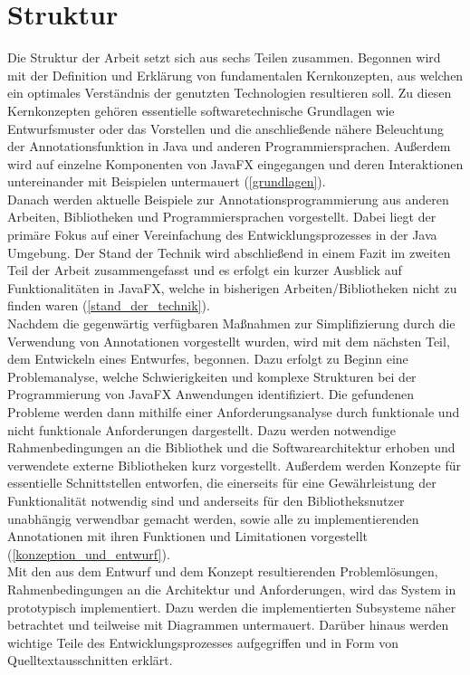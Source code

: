 \section{Struktur}
\label{struktur}
Die Struktur der Arbeit setzt sich aus sechs Teilen zusammen. Begonnen wird mit der Definition und Erklärung von fundamentalen Kernkonzepten, aus welchen ein optimales Verständnis der genutzten Technologien resultieren soll. Zu diesen Kernkonzepten gehören essentielle softwaretechnische Grundlagen wie Entwurfsmuster oder das Vorstellen und die anschließende nähere Beleuchtung der Annotationsfunktion in Java und anderen Programmiersprachen. Außerdem wird auf einzelne Komponenten von JavaFX eingegangen und deren Interaktionen untereinander mit Beispielen untermauert (\autoref{grundlagen}).\\
Danach werden aktuelle Beispiele zur Annotationsprogrammierung aus anderen Arbeiten, Bibliotheken und Programmiersprachen vorgestellt. Dabei liegt der primäre Fokus auf einer Vereinfachung des Entwicklungsprozesses in der Java Umgebung. Der Stand der Technik wird abschließend in einem Fazit im zweiten Teil der Arbeit zusammengefasst und es erfolgt ein kurzer Ausblick auf Funktionalitäten in JavaFX, welche in bisherigen Arbeiten/Bibliotheken nicht zu finden waren (\autoref{stand_der_technik}).\\
Nachdem die gegenwärtig verfügbaren Maßnahmen zur Simplifizierung durch die Verwendung von Annotationen vorgestellt wurden, wird mit dem nächsten Teil, dem Entwickeln eines Entwurfes, begonnen. Dazu erfolgt zu Beginn eine Problemanalyse, welche Schwierigkeiten und komplexe Strukturen bei der Programmierung von JavaFX Anwendungen identifiziert. Die gefundenen Probleme werden dann mithilfe einer Anforderungsanalyse durch funktionale und nicht funktionale Anforderungen dargestellt. Dazu werden notwendige Rahmenbedingungen an die Bibliothek und die Softwarearchitektur erhoben und verwendete externe Bibliotheken kurz vorgestellt. Außerdem werden Konzepte für essentielle Schnittstellen entworfen, die einerseits für eine Gewährleistung der Funktionalität notwendig sind und anderseits für den Bibliotheksnutzer unabhängig verwendbar gemacht werden, sowie alle zu implementierenden Annotationen mit ihren Funktionen und Limitationen vorgestellt (\autoref{konzeption_und_entwurf}).\\
Mit den aus dem Entwurf und dem Konzept resultierenden Problemlösungen, Rahmenbedingungen an die Architektur und Anforderungen, wird das System in  prototypisch implementiert. Dazu werden die implementierten Subsysteme näher betrachtet und teilweise mit Diagrammen untermauert. Darüber hinaus werden wichtige Teile des Entwicklungsprozesses aufgegriffen und in Form von Quelltextausschnitten erklärt.\\
